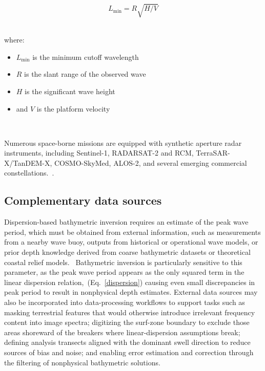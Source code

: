 \documentclass[12pt]{article}
\begin{document}
\begin{equation}
\label{Lmin}
L_{\min} = R\sqrt{{H}/{V}}
\end{equation}
~\cite{Bergsma2019}

where:
{\small
\begin{itemize}
    \item $L_{\min}$ is the minimum cutoff wavelength
    \item $R$ is the slant range of the observed wave
    \item $H$ is the significant wave height
    \item and $V$ is the platform velocity
\end{itemize}
}
~\cite{Bergsma2019}

Numerous space-borne missions are equipped with synthetic aperture radar instruments, including Sentinel-1, RADARSAT-2 and RCM, TerraSAR-X/TanDEM-X, COSMO-SkyMed, ALOS-2, and several emerging commercial constellations.~\cite{USGSRemoteSensingCompendium2020}.

\subsection{Complementary data sources}

Dispersion-based bathymetric inversion requires an estimate of the peak wave period, which must be obtained from external information, such as measurements from a nearby wave buoy, outputs from historical or operational wave models, or prior depth knowledge derived from coarse bathymetric datasets or theoretical coastal relief models.~\cite{DaniloMelgani2016} Bathymetric inversion is particularly sensitive to this parameter, as the peak wave period appears as the only squared term in the linear dispersion relation,~(Eq.~\ref{dispersion}) causing even small discrepancies in peak period to result in nonphysical depth estimates. External data sources may also be incorporated into data-processing workflows to support tasks such as masking terrestrial features that would otherwise introduce irrelevant frequency content into image spectra; digitizing the surf-zone boundary to exclude those areas shoreward of the breakers where linear-dispersion assumptions break; defining analysis transects aligned with the dominant swell direction to reduce sources of bias and noise; and enabling error estimation and correction through the filtering of nonphysical bathymetric solutions.

\end{document}
